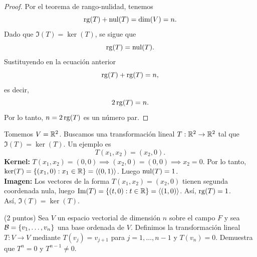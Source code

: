 \documentclass[12pt,a4paper]{article}
\begin{document}
    \begin{proof}
        Por el teorema de rango-nulidad, tenemos
        \begin{equation*}
            \operatorname{rg}(T)+\operatorname{nul}(T)=\dim(V)=n.
        \end{equation*}
        Dado que $\Im(T)=\ker(T)$, se sigue que
        \begin{equation*}
            \operatorname{rg}(T)=\operatorname{nul}(T).
        \end{equation*}
        Sustituyendo en la ecuación anterior
        \begin{equation*}
            \operatorname{rg}(T)+\operatorname{rg}(T)=n,
        \end{equation*}
        es decir,
        \begin{equation*}
            2\operatorname{rg}(T)=n.
        \end{equation*}
        Por lo tanto, $n=2\operatorname{rg}(T)$ es un número par.
    \end{proof}
    Tomemos $V=\mathbb{R}^{2}$. Buscamos una transformación lineal $T:\mathbb{R}^{2}\to\mathbb{R}^{2}$ tal que
    $\Im(T)=\ker(T)$. Un ejemplo es
    \begin{equation*}
        T(x_{1},x_{2})=(x_{2},0).
    \end{equation*}
    \textbf{Kernel:} $T(x_{1},x_{2})=(0,0)\implies(x_{2},0)=(0,0)\implies x_{2}=0$. Por lo tanto,
    $\ker(T)=\{(x_{1},0):x_{1}\in\mathbb{R}\}=\langle (0,1) \rangle$. Luego $\operatorname{nul}(T)=1$.\\
    \textbf{Imagen:} Los vectores de la forma $T(x_{1},x_{2})=(x_{2},0)$ tienen segunda coordenada nula,
    luego $\Im(T)=\{(t,0):t\in\mathbb{R}\}=\langle (1,0) \rangle$. Así, $\operatorname{rg}(T)=1$.\\
    Así, $\Im(T)=\ker(T)$.

    \begin{mdframed}[style=mdpinkbox,frametitle={Ejercicio 6}]
        (2 puntos) Sea $V$ un espacio vectorial de dimensión $n$ sobre el campo $F$ y sea $\mathcal{B}=\{v_{1},\dots,v_{n}\}$
        una base ordenada de $V$. Definimos la transformación lineal $T:V\to V$ mediante $T(v_{j})=v_{j+1}$
        para $j=1,\dots,n-1$ y $T(v_{n})=0$. Demuestra que $T^{n}=0$ y $T^{n-1}\neq0$.
    \end{mdframed}
\end{document}
